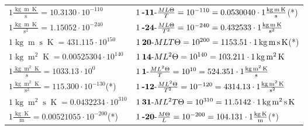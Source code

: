 \begin{center}
\begin{longtable}{l l}
{\color{black}$1 \bm{\mathrm{ }}\frac{\operatorname{kg}\operatorname{m}\operatorname{K}}{\operatorname{s}} = 10.3130\cdot10^{-110} $}&
	{\color{black}$1\:\text{\textbf{-11}-} \frac{ML\Theta}{T}=10^{-110} = 0.0530040 \cdot 1 \bm{\mathrm{ }}\frac{\operatorname{kg}\operatorname{m}\operatorname{K}}{\operatorname{s}}$}\quad(*)\\
{\color{black}$1 \bm{\mathrm{ }}\frac{\operatorname{kg}\operatorname{m}\operatorname{K}}{\operatorname{s}^2} = 1.15052\cdot10^{-240} $}&
	{\color{black}$1\:\text{\textbf{-24}-} \frac{ML\Theta}{T^2}=10^{-240} = 0.432533 \cdot 1 \bm{\mathrm{ }}\frac{\operatorname{kg}\operatorname{m}\operatorname{K}}{\operatorname{s}^2}$}\\
{\color{black}$1 \bm{\mathrm{ }}\operatorname{kg}\operatorname{m}\operatorname{s}\operatorname{K} = 431.115\cdot10^{150} $}&
	{\color{black}$1\:\text{\textbf{20}-} MLT\Theta=10^{200} = 1153.51 \cdot 1 \bm{\mathrm{ }}\operatorname{kg}\operatorname{m}\operatorname{s}\operatorname{K}$}\quad(*)\\
{\color{black}$1 \bm{\mathrm{ }}\operatorname{kg}\operatorname{m}^2\operatorname{K} = 0.00525304\cdot10^{140} $}&
	{\color{black}$1\:\text{\textbf{14}-} ML^2\Theta=10^{140} = 103.211 \cdot 1 \bm{\mathrm{ }}\operatorname{kg}\operatorname{m}^2\operatorname{K}$}\\
{\color{black}$1 \bm{\mathrm{ }}\frac{\operatorname{kg}\operatorname{m}^2\operatorname{K}}{\operatorname{s}} = 1033.13\cdot10^{0} $}&
	{\color{black}$1\:\text{\textbf{1}-} \frac{ML^2\Theta}{T}=10^{10} = 524.351 \cdot 1 \bm{\mathrm{ }}\frac{\operatorname{kg}\operatorname{m}^2\operatorname{K}}{\operatorname{s}}$}\\
{\color{black}$1 \bm{\mathrm{ }}\frac{\operatorname{kg}\operatorname{m}^2\operatorname{K}}{\operatorname{s}^2} = 115.300\cdot10^{-130} $}\quad(*)&
	{\color{black}$1\:\text{\textbf{-12}-} \frac{ML^2\Theta}{T^2}=10^{-120} = 4314.13 \cdot 1 \bm{\mathrm{ }}\frac{\operatorname{kg}\operatorname{m}^2\operatorname{K}}{\operatorname{s}^2}$}\\
{\color{black}$1 \bm{\mathrm{ }}\operatorname{kg}\operatorname{m}^2\operatorname{s}\operatorname{K} = 0.0432234\cdot10^{310} $}&
	{\color{black}$1\:\text{\textbf{31}-} ML^2T\Theta=10^{310} = 11.5142 \cdot 1 \bm{\mathrm{ }}\operatorname{kg}\operatorname{m}^2\operatorname{s}\operatorname{K}$}\\
{\color{black}$1 \bm{\mathrm{ }}\frac{\operatorname{kg}\operatorname{K}}{\operatorname{m}} = 0.00521055\cdot10^{-200} $}\quad(*)&
	{\color{black}$1\:\text{\textbf{-20}-} \frac{M\Theta}{L}=10^{-200} = 104.131 \cdot 1 \bm{\mathrm{ }}\frac{\operatorname{kg}\operatorname{K}}{\operatorname{m}}$}\quad(*)\\

\end{longtable}
\end{center}
